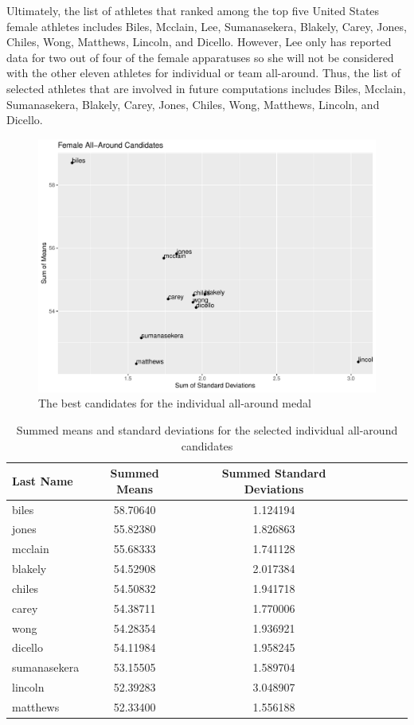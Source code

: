 \documentclass[12pt]{article}
\begin{document}
Ultimately, the list of athletes that ranked among the top five United States female athletes includes Biles, 
Mcclain, Lee, Sumanasekera, Blakely, Carey, Jones, Chiles, Wong, Matthews, Lincoln, and Dicello. However, Lee 
only has reported data for two out of four of the female apparatuses so she will not be considered with the other 
eleven athletes for individual or team all-around. Thus, the list of selected athletes that are involved in future 
computations includes Biles, Mcclain, Sumanasekera, Blakely, Carey, Jones, Chiles, Wong, Matthews, Lincoln, 
and Dicello.

\begin{figure}[tbp]
  \centering
  \includegraphics[scale=0.6]{AllAroundCandidates.pdf}
  \caption{The best candidates for the individual all-around medal}
  \label{fig:IAA}
\end{figure}

\begin{table}[tbp]
  \caption{Summed means and standard deviations for the selected individual all-around candidates}
  \label{tab:tableIAA}
\centering
\begin{tabular}[t]{lccllll}
 \toprule
Last Name & Summed Means & Summed Standard Deviations\\
\midrule
biles & 58.70640 & 1.124194\\
\midrule
jones & 55.82380 & 1.826863\\
\midrule
mcclain & 55.68333 & 1.741128\\
\midrule
blakely & 54.52908 & 2.017384\\
\midrule
chiles & 54.50832 & 1.941718\\
\midrule
carey & 54.38711 & 1.770006\\
\midrule
wong & 54.28354 & 1.936921\\
\midrule
dicello & 54.11984 & 1.958245\\
\midrule
sumanasekera & 53.15505 & 1.589704\\
\midrule
lincoln & 52.39283 & 3.048907\\
\midrule
matthews & 52.33400 & 1.556188\\
\bottomrule
\end{tabular}
\end{table}
\end{document}
